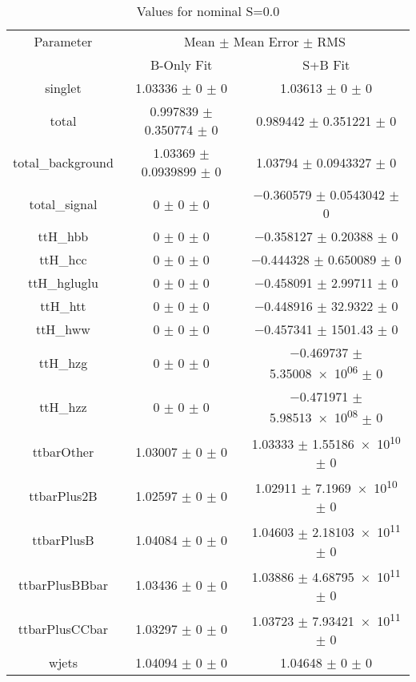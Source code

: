 \begin{table}
\centering
\caption{Values for nominal S=0.0}
\begin{tabular}{ccc}
\toprule
Parameter & \multicolumn{2}{c}{Mean $\pm$ Mean Error $\pm$ RMS}\\
 & B-Only Fit & S+B Fit\\
\midrule
singlet & \num{1.03336} $\pm$ \num{0} $\pm$ \num{0} & \num{1.03613} $\pm$ \num{0} $\pm$ \num{0}\\
total & \num{0.997839} $\pm$ \num{0.350774} $\pm$ \num{0} & \num{0.989442} $\pm$ \num{0.351221} $\pm$ \num{0}\\
total\_background & \num{1.03369} $\pm$ \num{0.0939899} $\pm$ \num{0} & \num{1.03794} $\pm$ \num{0.0943327} $\pm$ \num{0}\\
total\_signal & \num{0} $\pm$ \num{0} $\pm$ \num{0} & \num{-0.360579} $\pm$ \num{0.0543042} $\pm$ \num{0}\\
ttH\_hbb & \num{0} $\pm$ \num{0} $\pm$ \num{0} & \num{-0.358127} $\pm$ \num{0.20388} $\pm$ \num{0}\\
ttH\_hcc & \num{0} $\pm$ \num{0} $\pm$ \num{0} & \num{-0.444328} $\pm$ \num{0.650089} $\pm$ \num{0}\\
ttH\_hgluglu & \num{0} $\pm$ \num{0} $\pm$ \num{0} & \num{-0.458091} $\pm$ \num{2.99711} $\pm$ \num{0}\\
ttH\_htt & \num{0} $\pm$ \num{0} $\pm$ \num{0} & \num{-0.448916} $\pm$ \num{32.9322} $\pm$ \num{0}\\
ttH\_hww & \num{0} $\pm$ \num{0} $\pm$ \num{0} & \num{-0.457341} $\pm$ \num{1501.43} $\pm$ \num{0}\\
ttH\_hzg & \num{0} $\pm$ \num{0} $\pm$ \num{0} & \num{-0.469737} $\pm$ \num{5.35008e+06} $\pm$ \num{0}\\
ttH\_hzz & \num{0} $\pm$ \num{0} $\pm$ \num{0} & \num{-0.471971} $\pm$ \num{5.98513e+08} $\pm$ \num{0}\\
ttbarOther & \num{1.03007} $\pm$ \num{0} $\pm$ \num{0} & \num{1.03333} $\pm$ \num{1.55186e+10} $\pm$ \num{0}\\
ttbarPlus2B & \num{1.02597} $\pm$ \num{0} $\pm$ \num{0} & \num{1.02911} $\pm$ \num{7.1969e+10} $\pm$ \num{0}\\
ttbarPlusB & \num{1.04084} $\pm$ \num{0} $\pm$ \num{0} & \num{1.04603} $\pm$ \num{2.18103e+11} $\pm$ \num{0}\\
ttbarPlusBBbar & \num{1.03436} $\pm$ \num{0} $\pm$ \num{0} & \num{1.03886} $\pm$ \num{4.68795e+11} $\pm$ \num{0}\\
ttbarPlusCCbar & \num{1.03297} $\pm$ \num{0} $\pm$ \num{0} & \num{1.03723} $\pm$ \num{7.93421e+11} $\pm$ \num{0}\\
wjets & \num{1.04094} $\pm$ \num{0} $\pm$ \num{0} & \num{1.04648} $\pm$ \num{0} $\pm$ \num{0}\\
\bottomrule
\end{tabular}
\end{table}